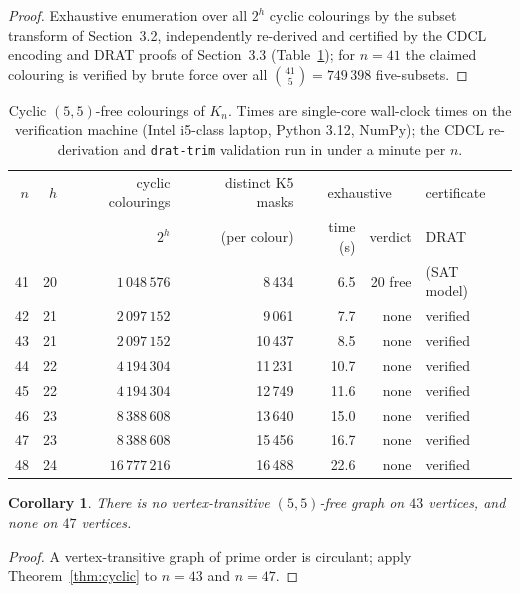\documentclass[11pt]{article}
\newtheorem{corollary}[theorem]{Corollary}
\theoremstyle{definition}
\theoremstyle{plain}
\newcommand{\K}{\ensuremath{K}}
\begin{document}
\begin{proof}
Exhaustive enumeration over all $2^h$ cyclic colourings by the subset
transform of Section~3.2, independently re-derived and certified by the CDCL
encoding and DRAT proofs of Section~3.3 (Table~\ref{tab:cyclic55}); for $n=41$
the claimed colouring is verified by brute force over all $\binom{41}{5} =
749\,398$ five-subsets.
\end{proof}

\begin{table}[ht]\centering\small
\begin{tabular}{rrrrrrl}
\toprule
$n$ & $h$ & cyclic colourings & distinct K5 masks & \multicolumn{2}{c}{exhaustive} & certificate \\
 & & $2^h$ & (per colour) & time (s) & verdict & DRAT \\
\midrule
41 & 20 & $1\,048\,576$ & 8\,434 & 6.5 & 20 free & (SAT model) \\
42 & 21 & $2\,097\,152$ & 9\,061 & 7.7 & none & verified \\
43 & 21 & $2\,097\,152$ & 10\,437 & 8.5 & none & verified \\
44 & 22 & $4\,194\,304$ & 11\,231 & 10.7 & none & verified \\
45 & 22 & $4\,194\,304$ & 12\,749 & 11.6 & none & verified \\
46 & 23 & $8\,388\,608$ & 13\,640 & 15.0 & none & verified \\
47 & 23 & $8\,388\,608$ & 15\,456 & 16.7 & none & verified \\
48 & 24 & $16\,777\,216$ & 16\,488 & 22.6 & none & verified \\
\bottomrule
\end{tabular}
\caption{Cyclic $(5,5)$-free colourings of $\K_n$. Times are single-core
wall-clock times on the verification machine (Intel i5-class laptop, Python 3.12,
NumPy); the CDCL re-derivation and \texttt{drat-trim} validation run in under a
minute per $n$.}
\label{tab:cyclic55}
\end{table}

\begin{corollary}\label{cor:vt5}
There is no vertex-transitive $(5,5)$-free graph on $43$ vertices, and none on
$47$ vertices.
\end{corollary}

\begin{proof}
A vertex-transitive graph of prime order is circulant; apply
Theorem~\ref{thm:cyclic} to $n = 43$ and $n = 47$.
\end{proof}
\end{document}
